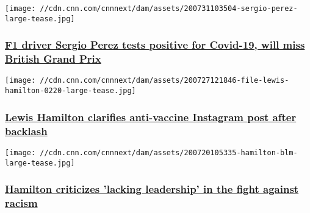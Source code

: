 \href{/2020/07/31/motorsport/sergio-perez-coronavirus-formula-one-british-grand-prix-spt-intl/index.html}{}

\texttt{[image: //cdn.cnn.com/cnnnext/dam/assets/200731103504-sergio-perez-large-tease.jpg]}

\hypertarget{f1-driver-sergio-perez-tests-positive-for-covid-19-will-miss-british-grand-prix}{%
\subsubsection{\texorpdfstring{\href{/2020/07/31/motorsport/sergio-perez-coronavirus-formula-one-british-grand-prix-spt-intl/index.html}{F1
driver Sergio Perez tests positive for Covid-19, will miss British Grand
Prix}}{F1 driver Sergio Perez tests positive for Covid-19, will miss British Grand Prix}}\label{f1-driver-sergio-perez-tests-positive-for-covid-19-will-miss-british-grand-prix}}

\href{/2020/07/27/sport/lewis-hamilton-anti-vaxxer-post-spt-intl-scli-gbr/index.html}{}

\texttt{[image: //cdn.cnn.com/cnnnext/dam/assets/200727121846-file-lewis-hamilton-0220-large-tease.jpg]}

\hypertarget{lewis-hamilton-clarifies-anti-vaccine-instagram-post-after-backlash}{%
\subsubsection{\texorpdfstring{\href{/2020/07/27/sport/lewis-hamilton-anti-vaxxer-post-spt-intl-scli-gbr/index.html}{Lewis
Hamilton clarifies anti-vaccine Instagram post after
backlash}}{Lewis Hamilton clarifies anti-vaccine Instagram post after backlash}}\label{lewis-hamilton-clarifies-anti-vaccine-instagram-post-after-backlash}}

\href{/2020/07/20/motorsport/hamilton-formula-one-racism-leadership-spt-intl/index.html}{}

\texttt{[image: //cdn.cnn.com/cnnnext/dam/assets/200720105335-hamilton-blm-large-tease.jpg]}

\hypertarget{hamilton-criticizes-lacking-leadership-in-the-fight-against-racism-}{%
\subsubsection{\texorpdfstring{\href{/2020/07/20/motorsport/hamilton-formula-one-racism-leadership-spt-intl/index.html}{Hamilton
criticizes 'lacking leadership' in the fight against racism
}}{Hamilton criticizes 'lacking leadership' in the fight against racism }}\label{hamilton-criticizes-lacking-leadership-in-the-fight-against-racism-}}

